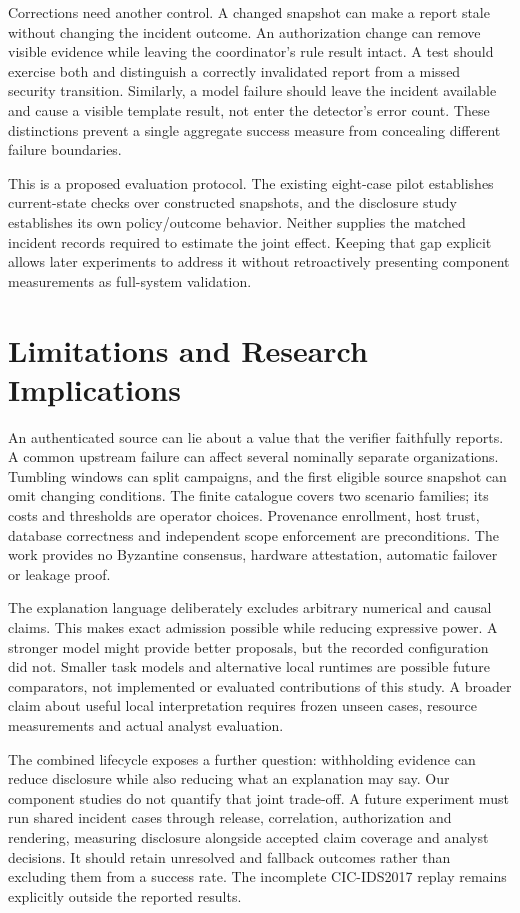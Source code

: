 \documentclass[conference,letterpaper]{IEEEtran}
\begin{document}
Corrections need another control. A changed snapshot can make a report stale without changing the incident outcome. An authorization change can remove visible evidence while leaving the coordinator's rule result intact. A test should exercise both and distinguish a correctly invalidated report from a missed security transition. Similarly, a model failure should leave the incident available and cause a visible template result, not enter the detector's error count. These distinctions prevent a single aggregate success measure from concealing different failure boundaries.

This is a proposed evaluation protocol. The existing eight-case pilot establishes current-state checks over constructed snapshots, and the disclosure study establishes its own policy/outcome behavior. Neither supplies the matched incident records required to estimate the joint effect. Keeping that gap explicit allows later experiments to address it without retroactively presenting component measurements as full-system validation.




\section{Limitations and Research Implications}
An authenticated source can lie about a value that the verifier faithfully reports. A common upstream failure can affect several nominally separate organizations. Tumbling windows can split campaigns, and the first eligible source snapshot can omit changing conditions. The finite catalogue covers two scenario families; its costs and thresholds are operator choices. Provenance enrollment, host trust, database correctness and independent scope enforcement are preconditions. The work provides no Byzantine consensus, hardware attestation, automatic failover or leakage proof.

The explanation language deliberately excludes arbitrary numerical and causal claims. This makes exact admission possible while reducing expressive power. A stronger model might provide better proposals, but the recorded configuration did not. Smaller task models and alternative local runtimes are possible future comparators, not implemented or evaluated contributions of this study. A broader claim about useful local interpretation requires frozen unseen cases, resource measurements and actual analyst evaluation.

The combined lifecycle exposes a further question: withholding evidence can reduce disclosure while also reducing what an explanation may say. Our component studies do not quantify that joint trade-off. A future experiment must run shared incident cases through release, correlation, authorization and rendering, measuring disclosure alongside accepted claim coverage and analyst decisions. It should retain unresolved and fallback outcomes rather than excluding them from a success rate. The incomplete CIC-IDS2017 replay remains explicitly outside the reported results.
\end{document}

